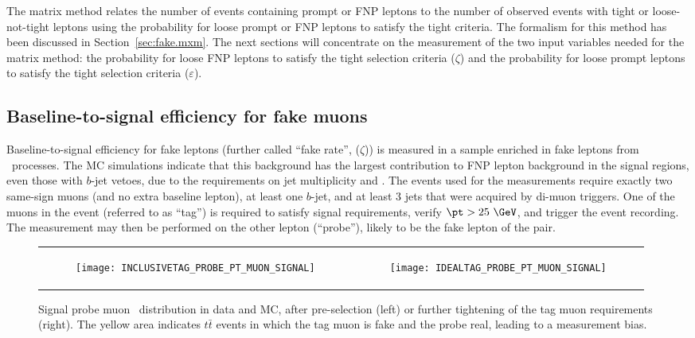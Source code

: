 The matrix method relates the number of events containing prompt or FNP leptons 
to the number of observed events with tight or loose-not-tight leptons 
using the probability for loose prompt or FNP leptons to satisfy the tight criteria.
The formalism for this method has been discussed in Section~\ref{sec:fake.mxm}.
The next sections will concentrate on the measurement of the 
two input variables needed for the matrix method:
the probability for loose FNP leptons to satisfy the tight selection
criteria ($\zeta$) and 
the probability for loose prompt leptons to satisfy the tight selection 
criteria ($\varepsilon$).

\subsection*{Baseline-to-signal efficiency for fake muons}

Baseline-to-signal efficiency for fake leptons (further called ``fake rate'', ($\zeta$)) is measured 
in a sample enriched in fake leptons from \ttbar\ processes.
The MC simulations indicate that this background has the largest contribution to FNP lepton background in the signal regions, 
even those with $b$-jet vetoes, due to the requirements on jet multiplicity and \met. 
The events used for the measurements require exactly two same-sign muons (and no extra baseline lepton), 
at least one $b$-jet, and at least 3 jets that were acquired by di-muon triggers.
One of the muons in the event (referred to as ``tag'') is required to satisfy signal requirements, verify $\pt>25~\GeV$, 
and trigger the event recording. 
The measurement may then be performed on the other lepton (``probe''), likely to be the fake lepton of the pair. 

\begin{figure}[t!]
\centering
\begin{tabular}{rr}
\begin{subfigure}[t]{0.5\textwidth}\texttt{[image: INCLUSIVETAG\_PROBE\_PT\_MUON\_SIGNAL]}\caption{}\label{fig:bkg.mxm.INCLUSIVETAG_PROBE_PT_MUON_SIGNAL}\end{subfigure}&
\begin{subfigure}[t]{0.5\textwidth}\texttt{[image: IDEALTAG\_PROBE\_PT\_MUON\_SIGNAL]}\caption{}\label{fig:bkg.mxm.IDEALTAG_PROBE_PT_MUON_SIGNAL}\end{subfigure} \\
\end{tabular}
\caption
{Signal probe muon \pt\ distribution in data and MC, after pre-selection (left) 
or further tightening of the tag muon requirements (right).
The yellow area indicates $t\bar t$ events in which the tag muon is fake and the probe real, 
leading to a measurement bias. 
}
\label{Fig:fakes_preselection_muon}
\end{figure}

